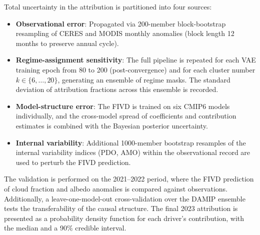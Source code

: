 \documentclass{article}
\begin{document}
Total uncertainty in the attribution is partitioned into four sources:
\begin{itemize}
    \item \textbf{Observational error}: Propagated via 200-member block-bootstrap resampling of CERES and MODIS monthly anomalies (block length 12 months to preserve annual cycle).
    \item \textbf{Regime-assignment sensitivity}: The full pipeline is repeated for each VAE training epoch from 80 to 200 (post-convergence) and for each cluster number $k \in \{6,\dots,20\}$, generating an ensemble of regime masks. The standard deviation of attribution fractions across this ensemble is recorded.
    \item \textbf{Model-structure error}: The FIVD is trained on six CMIP6 models individually, and the cross-model spread of coefficients and contribution estimates is combined with the Bayesian posterior uncertainty.
    \item \textbf{Internal variability}: Additional 1000-member bootstrap resamples of the internal variability indices (PDO, AMO) within the observational record are used to perturb the FIVD prediction.
\end{itemize}
The validation is performed on the 2021--2022 period, where the FIVD prediction of cloud fraction and albedo anomalies is compared against observations. Additionally, a leave-one-model-out cross-validation over the DAMIP ensemble tests the transferability of the causal structure. The final 2023 attribution is presented as a probability density function for each driver's contribution, with the median and a 90\% credible interval.
\end{document}

